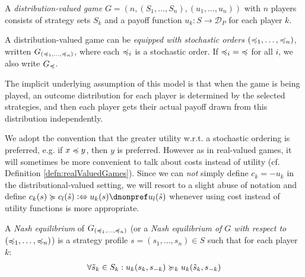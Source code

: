 \documentclass[a4paper]{scrreprt}
\newcommand{\D}{\mathcal{D}}
\begin{document}
    \begin{defn}
        A \emph{distribution-valued game} $G = (n, (S_1, \dots, S_n), (u_1, \dots, u_n))$ with $n$ players consists of strategy sets $S_k$ and a payoff function $u_k: S \to \D_P$ for each player $k$.
        
        A distribution-valued game can be \emph{equipped with stochastic orders} $(\preccurlyeq_1, \dots, \preccurlyeq_n)$, written $G_{(\preccurlyeq_1, \dots, \preccurlyeq_n)}$, where each $\preccurlyeq_i$ is a stochastic order.
        If $\preccurlyeq_i \mathbin{=} \preccurlyeq$ for all $i$, we also write $G_\preccurlyeq$.
    \end{defn}
    The implicit underlying assumption of this model is that when the game is being played, an outcome distribution for each player is determined by the selected strategies, and then each player gets their actual payoff drawn from this distribution independently.

    We adopt the convention that the greater utility w.r.t. a stochastic ordering is preferred, e.g. if $x \preccurlyeq y$, then $y$ is preferred. However as in real-valued games, it will sometimes be more convenient to talk about costs instead of utility (cf. Definition \ref{defn:realValuedGames}). Since we can \emph{not} simply define $c_k = -u_k$ in the distributional-valued setting, we will resort to a slight abuse of notation and define $c_k(s) \dpref c_l(\tilde{s}) \colonlra u_k(s) \dnonpref u_l(\tilde{s})$ whenever using cost instead of utility functions is more appropriate.

    \begin{defn}
        A \emph{Nash equilibrium} of $G_{(\preccurlyeq_1, \dots, \preccurlyeq_n)}$ (or a \emph{Nash equilibrium of $G$ with respect to $(\preccurlyeq_1, \dots, \preccurlyeq_n)$})
        is a strategy profile $s = (s_1, \dots, s_n) \in S$ such that for each player $k$:
        \begin{gather}
            \forall \tilde{s}_k \in S_k: u_k(s_k, s_{-k}) \dpref_k u_k(\tilde{s}_k, s_{-k})
        \end{gather}
    \end{defn}
\end{document}
